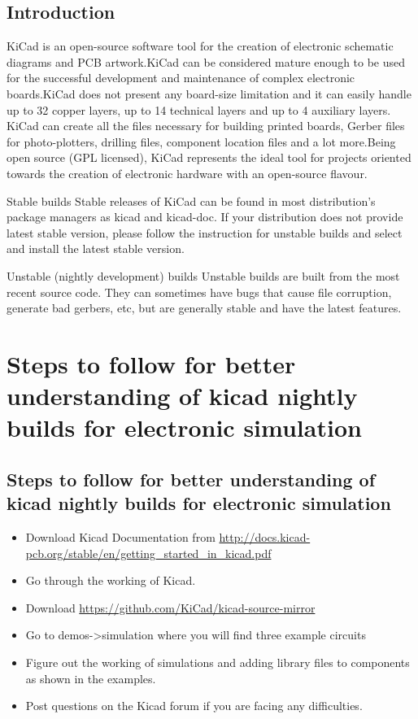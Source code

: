 \documentclass[12pt,a4paper]{  report}
\begin{document}
\section{Introduction}
KiCad is an open-source software tool for the creation of electronic schematic diagrams and PCB artwork.KiCad can be considered mature enough to be used for the successful development and maintenance of complex electronic boards.KiCad does not present any board-size limitation and it can easily handle up to 32 copper layers, up to 14 technical layers and up to 4 auxiliary layers. KiCad can create all the files necessary for building printed boards, Gerber files for photo-plotters, drilling files, component location files and a lot more.Being open source (GPL licensed), KiCad represents the ideal tool for projects oriented towards the creation of electronic hardware with an open-source flavour.

Stable builds
Stable releases of KiCad can be found in most distribution’s package managers as kicad and kicad-doc. If your distribution does not provide latest stable version, please follow the instruction for unstable builds and select and install the latest stable version.

Unstable (nightly development) builds
Unstable builds are built from the most recent source code. They can
sometimes have bugs that cause file corruption, generate bad gerbers, etc, but are generally stable and have the latest  features.

\chapter{\textbf{Steps to follow for better understanding of kicad nightly builds for electronic simulation}}
\section{Steps to follow for better understanding of kicad nightly builds for electronic simulation}
\begin{itemize}
\item Download Kicad Documentation from \url{http://docs.kicad-pcb.org/stable/en/getting_started_in_kicad.pdf}
\item Go through the working of Kicad.
\item Download \url{https://github.com/KiCad/kicad-source-mirror}
\item Go to demos->simulation where you will find three example circuits
\item Figure out the working of simulations and adding library files to components as shown in the examples.
\item  Post questions on the Kicad forum if you are facing any difficulties.
\end{itemize}
\end{document}
